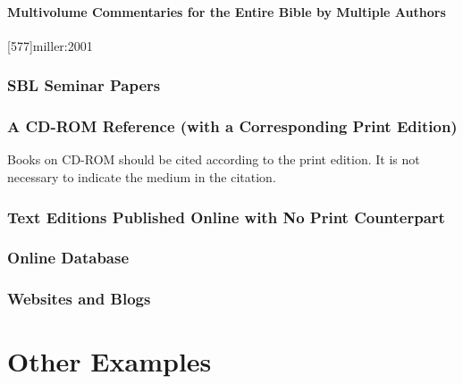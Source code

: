 \documentclass[a4paper]{article}
\begin{document}
\paragraph{Multivolume Commentaries for the Entire Bible by Multiple Authors}

[577]{miller:2001}
\toggletrue{fullbibrefs}
\togglefalse{fullbibrefs}

\subsubsection{SBL Seminar Papers}


\subsubsection{A CD-ROM Reference (with a Corresponding Print Edition)}

Books on CD-ROM should be cited according to the print edition. It is not
necessary to indicate the medium in the citation.

\subsubsection{Text Editions Published Online with No Print Counterpart}


\subsubsection{Online Database}



\subsubsection{Websites and Blogs}



\section{Other Examples}
\end{document}
